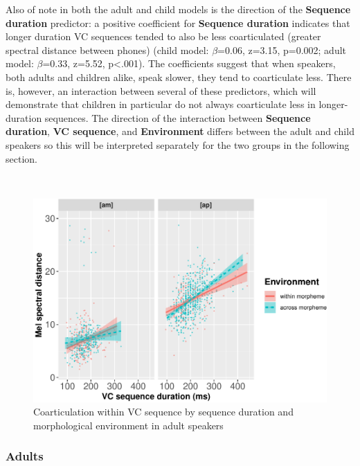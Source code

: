 \documentclass[a4paper,man,floatsintext,natbib,donotrepeattitle, apacite]{apa6}
\begin{document}
Also of note in both the adult and child models is the direction of the \textbf{Sequence duration} predictor: a positive coefficient for \textbf{Sequence duration} indicates that longer duration VC sequences tended to also be less coarticulated (greater spectral distance between phones) (child model: \(\beta\)=0.06, z=3.15, p=0.002; adult model: \(\beta\)=0.33, z=5.52, p\textless.001). The coefficients suggest that when speakers, both adults and children alike, speak slower, they tend to coarticulate less. There is, however, an interaction between several of these predictors, which will demonstrate that children in particular do not always coarticulate less in longer-duration sequences. The direction of the interaction between \textbf{Sequence duration}, \textbf{VC sequence}, and \textbf{Environment} differs between the adult and child speakers so this will be interpreted separately for the two groups in the following section.

~
~

\begin{figure}[H]
\centering
\includegraphics{3_ch3_results_files/figure-latex/adult-int-plot-1.pdf}
\caption{\label{fig:adult-int-plot}Coarticulation within VC sequence by sequence duration and morphological environment in adult speakers}
\end{figure}




\subsubsection{Adults}\label{adults}
\end{document}
